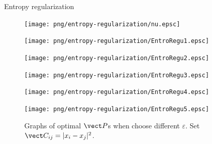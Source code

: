 \begin{frame}{Entropy regularization}
    \vspace{-1em}
    \begin{figure}
        \captionsetup{font=scriptsize}
        \begin{minipage}[t]{0.05\linewidth}
            \vspace{0pt}
            \centering
            \texttt{[image: png/entropy-regularization/nu.epsc]}
        \end{minipage}
        \hfill
        \begin{minipage}[t]{0.18\linewidth}
            \vspace{0pt}
            \centering
            \texttt{[image: png/entropy-regularization/EntroRegu1.epsc]}
            \caption*{$\varepsilon = 1$}
        \end{minipage}
        \hfill
        \begin{minipage}[t]{0.18\linewidth}
            \vspace{0pt}
            \centering
            \texttt{[image: png/entropy-regularization/EntroRegu2.epsc]}
            \caption*{$\varepsilon = 5\times 10^{-2}$}
        \end{minipage}
        \hfill
        \begin{minipage}[t]{0.18\linewidth}
            \vspace{0pt}
            \centering
            \texttt{[image: png/entropy-regularization/EntroRegu3.epsc]}
            \caption*{$\varepsilon = 10^{-2}$}
        \end{minipage}
        \hfill
        \begin{minipage}[t]{0.18\linewidth}
            \vspace{0pt}
            \centering
            \texttt{[image: png/entropy-regularization/EntroRegu4.epsc]}
            \caption*{$\varepsilon = 10^{-3}$}
        \end{minipage}
        \hfill
        \begin{minipage}[t]{0.18\linewidth}
            \vspace{0pt}
            \centering
            \texttt{[image: png/entropy-regularization/EntroRegu5.epsc]}
            \caption*{$\varepsilon = 10^{-4}$}
        \end{minipage}
        \hfill
        \vspace{-.8em}
        \caption{Graphs of optimal $\vect P$s when choose different $\varepsilon$. Set $\vect C_{ij} = |x_i-x_j|^2$.}
    \end{figure}
\end{frame}

